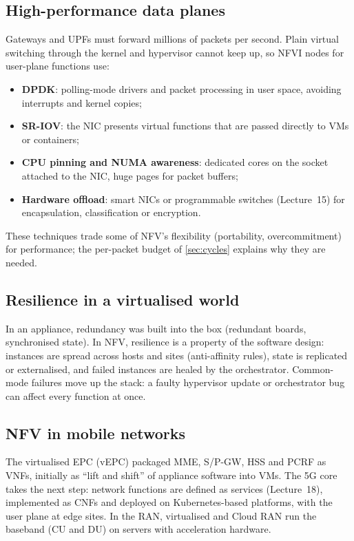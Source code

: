 \documentclass[11pt,a4paper]{article}
\begin{document}
\subsection{High-performance data planes}
Gateways and UPFs must forward millions of packets per second. Plain virtual switching through the kernel and
hypervisor cannot keep up, so NFVI nodes for user-plane functions use:
\begin{itemize}
  \item \textbf{DPDK}: polling-mode drivers and packet processing in user space, avoiding interrupts and kernel
        copies;
  \item \textbf{SR-IOV}: the NIC presents virtual functions that are passed directly to VMs or containers;
  \item \textbf{CPU pinning and NUMA awareness}: dedicated cores on the socket attached to the NIC, huge pages for
        packet buffers;
  \item \textbf{Hardware offload}: smart NICs or programmable switches (Lecture~15) for encapsulation, classification
        or encryption.
\end{itemize}
These techniques trade some of NFV's flexibility (portability, overcommitment) for performance; the per-packet
budget of \cref{sec:cycles} explains why they are needed.

\subsection{Resilience in a virtualised world}
In an appliance, redundancy was built into the box (redundant boards, synchronised state). In NFV, resilience is a
property of the software design: instances are spread across hosts and sites (anti-affinity rules), state is
replicated or externalised, and failed instances are healed by the orchestrator. Common-mode failures move up the
stack: a faulty hypervisor update or orchestrator bug can affect every function at once.

\subsection{NFV in mobile networks}
The virtualised EPC (vEPC) packaged MME, S/P-GW, HSS and PCRF as VNFs, initially as ``lift and shift'' of
appliance software into VMs. The 5G core takes the next step: network functions are defined as services
(Lecture~18), implemented as CNFs and deployed on Kubernetes-based platforms, with the user plane at edge sites.
In the RAN, virtualised and Cloud RAN run the baseband (CU and DU) on servers with acceleration hardware.
\end{document}
